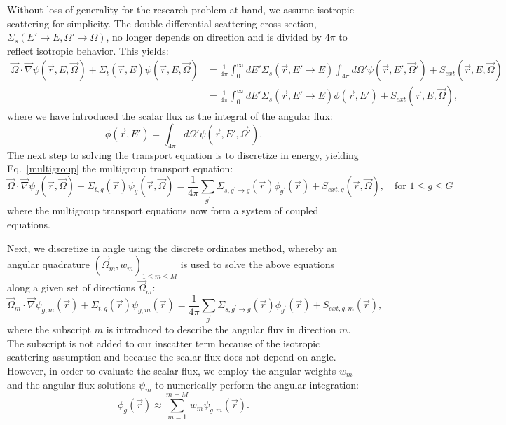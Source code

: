 \documentclass[11pt, letterpaper,titlepage,oneside]{article}
\newcommand{\vr}{\vec{r}}
\newcommand{\vo}{\vec{\Omega}}
\begin{document}
Without loss of generality for the research problem at hand, we assume isotropic scattering for simplicity. The double differential scattering cross section, $\Sigma_s(E'\to E, \Omega'\to\Omega)$, no longer depends on direction and is divided by $4\pi$ to reflect isotropic behavior. This yields:
\begin{align}
\label{isotropic}
\vo \cdot \vec \nabla \psi(\vr,E,\vo) +\Sigma_t(\vr,E) \psi(\vr,E,\vo)  
& = \frac{1}{4\pi}\int_{0}^{\infty}dE' \Sigma_s(\vr,E'\to E) \int_{4\pi}d\Omega' \psi(\vr,E',\vo')  + S_{ext}(\vr,E,\vo) \nonumber \\
& = \frac{1}{4\pi}\int_{0}^{\infty}dE' \Sigma_s(\vr,E'\to E) \phi(\vr,E')  + S_{ext}(\vr,E,\vo) ,
\end{align}
where we have introduced the scalar flux as the integral of the angular flux:
\begin{equation}
\label{def_scalar_flux}
\phi(\vr,E') = \int_{4\pi}d\Omega' \psi(\vr,E',\vo').
\end{equation}
The next step to solving the transport equation is to discretize in energy, yielding Eq.~\eqref{multigroup} the multigroup transport equation:
\begin{equation}
\vo \cdot \vec \nabla \psi_g(\vr,\vo) +\Sigma_{t,g}(\vr) \psi_g(\vr,\vo) = \frac{1}{4\pi}\sum_{g^{\prime}}\Sigma_{s,g^{\prime}\to g}(\vr)\phi_{g^{\prime}}(\vr) + S_{ext,g}(\vr,\vo), \quad \text{for } 1 \le g \le G
\label{multigroup}
\end{equation}
where the multigroup transport equations now form a system of coupled equations. 

Next, we discretize in angle using the discrete ordinates method\cite{denovo}, whereby an angular quadrature $\left( \vo_m, w_m \right)_{1 \le m \le M}$ is used to solve the above equations along a given set of directions $\vo_m$:
\begin{equation}
\vo_m \cdot \vec \nabla \psi_{g,m}(\vr) +\Sigma_{t,g}(\vr) \psi_{g,m}(\vr)  = \frac{1}{4\pi}\sum_{g^{\prime}}\Sigma_{s,g^{\prime}\to g}(\vr)\phi_{g^{\prime}}(\vr) + S_{ext,g,m}(\vr),
\label{angle}
\end{equation}
where the subscript $m$ is introduced to describe the angular flux in direction $m$. The subscript is not added to our inscatter term because of the isotropic scattering assumption and because the scalar flux does not depend on angle. However, in order to evaluate the scalar flux, we employ the angular weights $w_m$ and the angular flux solutions
$\psi_m$ to numerically perform the angular integration:
\begin{equation}
\label{def_scalar_flux_2}
\phi_g(\vr) \approx \sum_{m=1}^{m=M} w_m \psi_{g,m}(\vr).
\end{equation}
\end{document}
